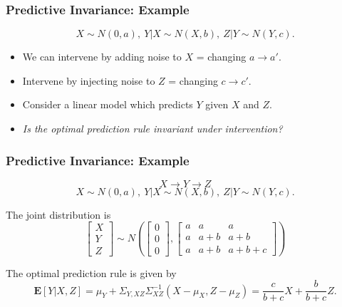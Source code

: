 \documentclass{beamer}
\newcommand{\E}{\textbf{E}}
\begin{document}
\begin{frame}
\frametitle{Predictive Invariance: Example}
\begin{center}
\[X \sim N(0, a),\ Y|X \sim N(X, b),\ Z|Y \sim N(Y, c).\]
\end{center}
\begin{itemize}
\item We can intervene by adding noise to $X$ = changing $a \to a'$.
\item Intervene by injecting noise to $Z$ = changing $c \to c'$.
\item Consider a linear model which predicts $Y$ given $X$ and $Z$.
\item \emph{Is the optimal prediction rule invariant under intervention?}
\end{itemize}
\end{frame}


\begin{frame}
\frametitle{Predictive Invariance: Example}
\begin{center}
\[X \to Y \to Z\]
\[X \sim N(0, a),\ Y|X \sim N(X, b),\ Z|Y \sim N(Y, c).\]
\end{center}

The joint distribution is 
\[
\begin{bmatrix}
X \\ Y\\Z
\end{bmatrix}
\sim
N\left(
\begin{bmatrix}
0 \\ 0 \\ 0
\end{bmatrix},
\begin{bmatrix}
a & a & a \\
a & a + b & a + b\\
a & a + b & a + b + c
\end{bmatrix}
\right)
\]

The optimal prediction rule is given by
\[
\E[Y|X, Z] = \mu_Y + \Sigma_{Y, XZ}\Sigma_{XZ}^{-1} (X - \mu_X, Z - \mu_Z) = \frac{c}{b + c} X + \frac{b}{b+c} Z.
\]

\end{frame}
\end{document}
